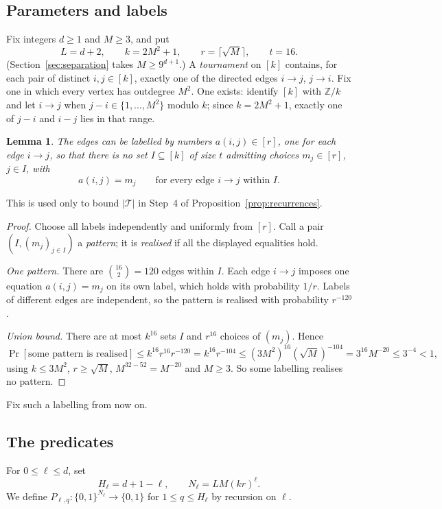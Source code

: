 \documentclass[11pt]{article}
\newtheorem{lemma}[theorem]{Lemma}
\theoremstyle{definition}
\theoremstyle{remark}
\begin{document}
\subsection{Parameters and labels}

Fix integers \(d\ge1\) and \(M\ge3\), and put
\[
 L=d+2,\qquad k=2M^2+1,\qquad r=\lceil\sqrt M\rceil,\qquad t=16.
\]
(Section~\ref{sec:separation} takes $M\ge9^{d+1}$.) A \emph{tournament} on
$[k]$ contains, for each pair of distinct $i,j\in[k]$, exactly one of the
directed edges $i\to j$, $j\to i$. Fix one in which every vertex has
outdegree $M^2$. One exists: identify $[k]$ with $\mathbb Z/k$ and let
$i\to j$ when $j-i\in\{1,\ldots,M^2\}$ modulo $k$; since $k=2M^2+1$, exactly
one of $j-i$ and $i-j$ lies in that range.

\begin{lemma}\label{lem:labelling}
The edges can be labelled by numbers \(a(i,j)\in[r]\), one for each edge
$i\to j$, so that there is no set \(I\subseteq[k]\) of size \(t\) admitting
choices \(m_j\in[r]\), \(j\in I\), with
\[
 a(i,j)=m_j \qquad\text{for every edge }i\to j\text{ within }I.
\]
\end{lemma}
This is used only to bound $|\mathcal T|$ in Step~4 of
Proposition~\ref{prop:recurrences}.
\begin{proof}
Choose all labels independently and uniformly from $[r]$. Call a pair
$(I,(m_j)_{j\in I})$ a \emph{pattern}; it is \emph{realised} if all the
displayed equalities hold.

\emph{One pattern.} There are $\binom{16}{2}=120$ edges within $I$. Each
edge $i\to j$ imposes one equation $a(i,j)=m_j$ on its own label, which holds
with probability $1/r$. Labels of different edges are independent, so the
pattern is realised with probability $r^{-120}$.

\emph{Union bound.} There are at most $k^{16}$ sets $I$ and $r^{16}$ choices
of $(m_j)$. Hence
\[
 \Pr[\text{some pattern is realised}]
 \le k^{16}r^{16}r^{-120}=k^{16}r^{-104}
 \le(3M^2)^{16}(\sqrt M)^{-104}=3^{16}M^{-20}\le3^{-4}<1,
\]
using $k\le3M^2$, $r\ge\sqrt M$, $M^{32-52}=M^{-20}$ and $M\ge3$. So some
labelling realises no pattern.
\end{proof}

Fix such a labelling from now on.

\subsection{The predicates}

For \(0\le\ell\le d\), set
\[
 H_\ell=d+1-\ell,\qquad N_\ell=LM(kr)^\ell.
\]
We define $P_{\ell,q}:\{0,1\}^{N_\ell}\to\{0,1\}$ for $1\le q\le H_\ell$ by
recursion on $\ell$.
\end{document}
